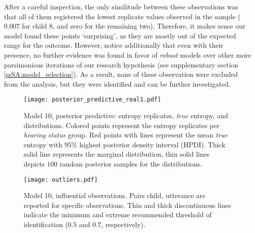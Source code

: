 After a careful inspection, the only similitude between these observations was that all of them registered the lowest replicate values observed in the sample ($0.007$ for child 8, and zero for the remaining two). Therefore, it makes sense our model found these points `surprising', as they are mostly out of the expected range for the outcome. However, notice additionally that even with their presence, no further evidence was found in favor of \textit{robust} models over other more parsimonious iterations of our research hypothesis (see supplementary section \ref{ssSA:model_selection}). As a result, none of these observation were excluded from the analysis, but they were identified and can be further investigated.
%
%
\begin{figure}[!h]
	\centering
	\texttt{[image: posterior\_predictive\_real1.pdf]}
	\caption[Model 10, posterior predictive: entropy replicates, \textit{true} entropy, and distributions]{Model 10, posterior predictive: entropy replicates, \textit{true} entropy, and distributions. Colored points represent the entropy replicates per \textit{hearing status} group. Red points with lines represent the mean \textit{true} entropy with $95\%$ highest posterior density interval (HPDI). Thick solid line represents the marginal distribution, thin solid lines depicts $100$ random posterior samples for the distributions.}
	\label{fig:predictive1}
\end{figure}
%
%
\begin{figure}[!h]
	\centering
	\texttt{[image: outliers.pdf]}
	\caption[Model 10, influential observations]{Model 10, influential observations. Pairs child, utterance are reported for specific observations. Thin and thick discontinuous lines indicate the minimum and extreme recommended threshold of identification ($0.5$ and $0.7$, respectively).}
	\label{fig:outliers}
\end{figure}
%
%